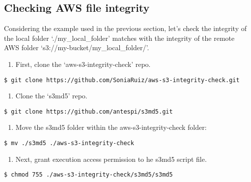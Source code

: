\documentclass[]{book}
\providecommand{\tightlist}{%
  \setlength{\itemsep}{0pt}\setlength{\parskip}{0pt}}
\begin{document}
\subsection{Checking AWS file
integrity}\label{checking-aws-file-integrity}

Considering the example used in the previous section, let's check the
integrity of the local folder `./my\_local\_folder' matches with the
integrity of the remote AWS folder `s3://my-bucket/my\_local\_folder/'.

\begin{enumerate}
\def\labelenumi{\arabic{enumi}.}
\tightlist
\item
  First, clone the `aws-s3-integrity-check' repo.
\end{enumerate}

\begin{verbatim}
$ git clone https://github.com/SoniaRuiz/aws-s3-integrity-check.git
\end{verbatim}

\begin{enumerate}
\def\labelenumi{\arabic{enumi}.}
\setcounter{enumi}{1}
\tightlist
\item
  Clone the `s3md5' repo.
\end{enumerate}

\begin{verbatim}
$ git clone https://github.com/antespi/s3md5.git
\end{verbatim}

\begin{enumerate}
\def\labelenumi{\arabic{enumi}.}
\setcounter{enumi}{2}
\tightlist
\item
  Move the s3md5 folder within the aws-s3-integrity-check folder:
\end{enumerate}

\begin{verbatim}
$ mv ./s3md5 ./aws-s3-integrity-check
\end{verbatim}

\begin{enumerate}
\def\labelenumi{\arabic{enumi}.}
\setcounter{enumi}{3}
\tightlist
\item
  Next, grant execution access permission to he s3md5 script file.
\end{enumerate}

\begin{verbatim}
$ chmod 755 ./aws-s3-integrity-check/s3md5/s3md5
\end{verbatim}
\end{document}
